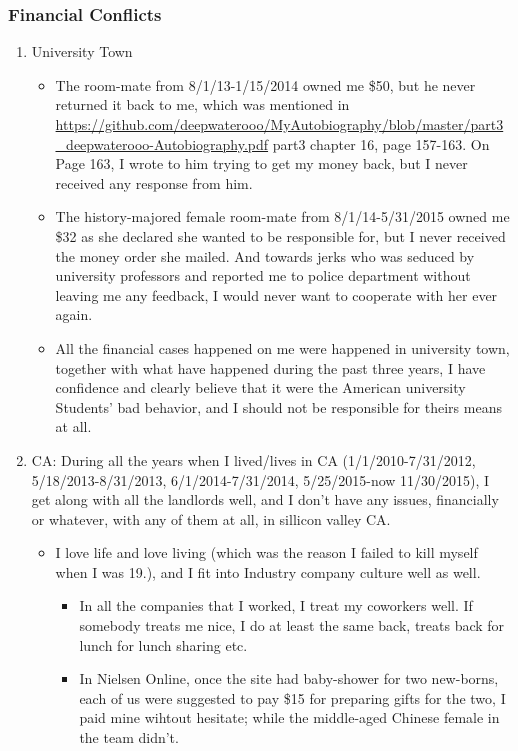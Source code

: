 \documentclass[9pt,b5paper]{article}
\begin{document}
\subsubsection{Financial Conflicts}
\label{sec-2-4-2}
\begin{enumerate}
\item University Town
\label{sec-2-4-2-1}
\begin{itemize}
\item The room-mate from 8/1/13-1/15/2014 owned me \$50, but he never returned it back to me, which was mentioned in \url{https://github.com/deepwaterooo/MyAutobiography/blob/master/part3_deepwaterooo-Autobiography.pdf} part3 chapter 16, page 157-163. On Page 163, I wrote to him trying to get my money back, but I never received any response from him.
\item The history-majored female room-mate from 8/1/14-5/31/2015 owned me \$32 as she declared she wanted to be responsible for, but I never received the money order she mailed. And towards jerks who was seduced by university professors and reported me to police department without leaving me any feedback, I would never want to cooperate with her ever again.
\item All the financial cases happened on me were happened in university town, together with what have happened during the past three years, I have confidence and clearly believe that it were the American university Students' bad behavior, and I should not be responsible for theirs means at all.
\end{itemize}
\item CA: During all the years when I lived/lives in CA (1/1/2010-7/31/2012, 5/18/2013-8/31/2013, 6/1/2014-7/31/2014, 5/25/2015-now 11/30/2015), I get along with all the landlords well, and I don't have any issues, financially or whatever, with any of them at all, in sillicon valley CA.
\label{sec-2-4-2-2}
\begin{itemize}
\item I love life and love living (which was the reason I failed to kill myself when I was 19.), and I fit into Industry company culture well as well. 
\begin{itemize}
\item In all the companies that I worked, I treat my coworkers well. If somebody treats me nice, I do at least the same back, treats back for lunch for lunch sharing etc.
\item In Nielsen Online, once the site had baby-shower for two new-borns, each of us were suggested to pay \$15 for preparing gifts for the two, I paid mine wihtout hesitate; while the middle-aged Chinese female in the team didn't.

\end{itemize}
\end{itemize}
\end{enumerate}
\end{document}
